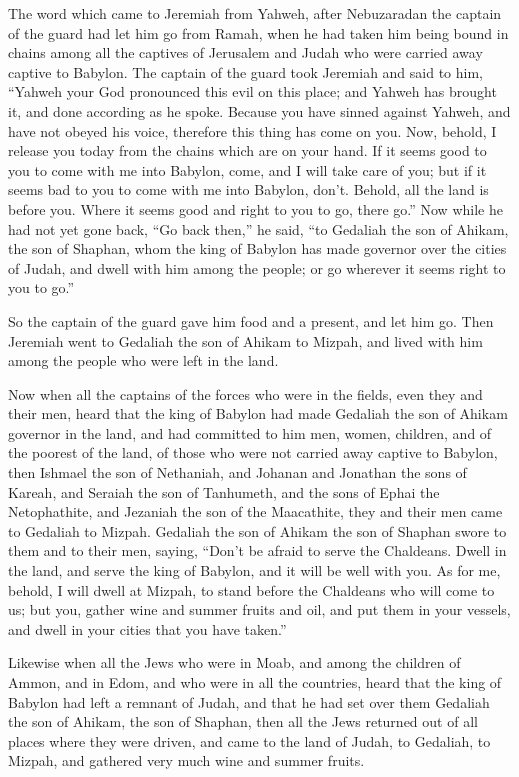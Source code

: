  The word which came to Jeremiah from Yahweh, after
Nebuzaradan the captain of the guard had let him go from Ramah, when he
had taken him being bound in chains among all the captives of Jerusalem
and Judah who were carried away captive to Babylon.  The
captain of the guard took Jeremiah and said to him, ``Yahweh your God
pronounced this evil on this place;  and Yahweh has
brought it, and done according as he spoke. Because you have sinned
against Yahweh, and have not obeyed his voice, therefore this thing has
come on you.  Now, behold, I release you today from the
chains which are on your hand. If it seems good to you to come with me
into Babylon, come, and I will take care of you; but if it seems bad to
you to come with me into Babylon, don't. Behold, all the land is before
you. Where it seems good and right to you to go, there go.''
 Now while he had not yet gone back, ``Go back then,'' he
said, ``to Gedaliah the son of Ahikam, the son of Shaphan, whom the king
of Babylon has made governor over the cities of Judah, and dwell with
him among the people; or go wherever it seems right to you to go.''

So the captain of the guard gave him food and a present, and let him go.
 Then Jeremiah went to Gedaliah the son of Ahikam to
Mizpah, and lived with him among the people who were left in the land.

 Now when all the captains of the forces who were in the
fields, even they and their men, heard that the king of Babylon had made
Gedaliah the son of Ahikam governor in the land, and had committed to
him men, women, children, and of the poorest of the land, of those who
were not carried away captive to Babylon,  then Ishmael
the son of Nethaniah, and Johanan and Jonathan the sons of Kareah, and
Seraiah the son of Tanhumeth, and the sons of Ephai the Netophathite,
and Jezaniah the son of the Maacathite, they and their men came to
Gedaliah to Mizpah.  Gedaliah the son of Ahikam the son of
Shaphan swore to them and to their men, saying, ``Don't be afraid to
serve the Chaldeans. Dwell in the land, and serve the king of Babylon,
and it will be well with you.  As for me, behold, I will
dwell at Mizpah, to stand before the Chaldeans who will come to us; but
you, gather wine and summer fruits and oil, and put them in your
vessels, and dwell in your cities that you have taken.''

 Likewise when all the Jews who were in Moab, and among
the children of Ammon, and in Edom, and who were in all the countries,
heard that the king of Babylon had left a remnant of Judah, and that he
had set over them Gedaliah the son of Ahikam, the son of Shaphan,
 then all the Jews returned out of all places where they
were driven, and came to the land of Judah, to Gedaliah, to Mizpah, and
gathered very much wine and summer fruits.

